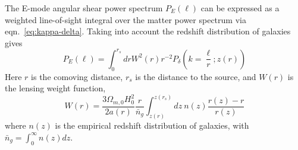 The E-mode angular shear power spectrum $P_E(\ell)$ can be expressed as a
weighted line-of-sight integral over the matter power 
spectrum via eqn.~\ref{eq:kappa-delta}.  Taking into account the redshift
distribution of galaxies gives \citep[see][]{Takada04}
\begin{equation}
  \label{eq:P_gamma}
  P_E(\ell) = \int_0^{r_s}dr W^2(r)r^{-2}
  P_\delta\left(k=\frac{\ell}{r};z(r)\right)
\end{equation}
Here $r$ is the comoving distance, $r_s$ is the distance to the
source, and $W(r)$ is the lensing weight function,
\begin{equation}
  \label{eq:lensing_weight}
  W(r) = \frac{3\Omega_{m,0}H_0^2}{2a(r)}\frac{r}{\bar{n}_g}
  \int_{z(r)}^{z(r_s)}dz\ n(z) \frac{r(z)-r}{r(z)}
\end{equation}
where $n(z)$ is the empirical redshift distribution of galaxies,
with $\bar{n}_g = \int_0^\infty n(z)dz$.


